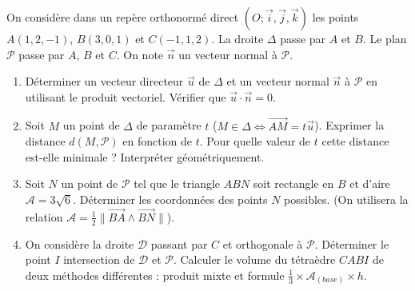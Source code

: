 \documentclass[11pt]{article}
\begin{document}
\begin{exercice}
On considère dans un repère orthonormé direct $(O;\vec{i},\vec{j},\vec{k})$ les points $A(1,2,-1)$, $B(3,0,1)$ et $C(-1,1,2)$. La droite $\Delta$ passe par $A$ et $B$. Le plan $\mathcal{P}$ passe par $A$, $B$ et $C$. On note $\vec{n}$ un vecteur normal à $\mathcal{P}$.
\begin{enumerate}
    \item Déterminer un vecteur directeur $\vec{u}$ de $\Delta$ et un vecteur normal $\vec{n}$ à $\mathcal{P}$ en utilisant le produit vectoriel. Vérifier que $\vec{u}\cdot\vec{n}=0$.
    \item Soit $M$ un point de $\Delta$ de paramètre $t$ ($M\in\Delta \Leftrightarrow \overrightarrow{AM}=t\vec{u}$). Exprimer la distance $d(M,\mathcal{P})$ en fonction de $t$. Pour quelle valeur de $t$ cette distance est-elle minimale ? Interpréter géométriquement.
    \item Soit $N$ un point de $\mathcal{P}$ tel que le triangle $ABN$ soit rectangle en $B$ et d'aire $\mathcal{A}=3\sqrt{6}$. Déterminer les coordonnées des points $N$ possibles. (On utilisera la relation $\mathcal{A}=\frac{1}{2}\|\overrightarrow{BA}\wedge\overrightarrow{BN}\|$).
    \item On considère la droite $\mathcal{D}$ passant par $C$ et orthogonale à $\mathcal{P}$. Déterminer le point $I$ intersection de $\mathcal{D}$ et $\mathcal{P}$. Calculer le volume du tétraèdre $CABI$ de deux méthodes différentes : produit mixte et formule $\frac{1}{3}\times\mathcal{A}_{(base)}\times h$.
\end{enumerate}
\end{exercice}
\end{document}
